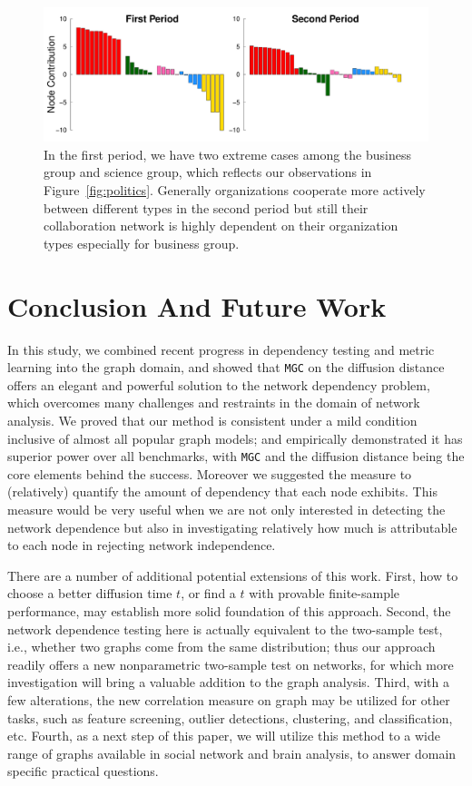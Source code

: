 \documentclass[11pt]{article}
\theoremstyle{definition}
\begin{document}
\begin{figure}[h]
	\centering
	\includegraphics[width=\linewidth]{barplots_nolegend.pdf}	
	\caption{In the first period, we have two extreme cases among the business group and science group, which reflects our observations in Figure~\ref{fig:politics}. Generally organizations cooperate more actively between different types in the second period but still their collaboration network is highly dependent on their organization types especially for business group.}
	\label{fig:barplots}
\end{figure}

\vspace*{-0.5cm}
\section{Conclusion And Future Work}
\label{sec:conc}
	\vspace*{-0.2cm}
In this study, we combined recent progress in dependency testing and metric learning into the graph domain, and showed that \texttt{MGC} on the diffusion distance offers an elegant and powerful solution to the network dependency problem, which overcomes many challenges and restraints in the domain of network analysis. We proved that our method is consistent under a mild condition inclusive of almost all popular graph models; and empirically demonstrated it has superior power over all benchmarks, with \texttt{MGC} and the diffusion distance being the core elements behind the success. Moreover we suggested the measure to (relatively) quantify the amount of dependency that each node exhibits. This measure would be very useful when we are not only interested in detecting the network dependence but also in investigating relatively how much is attributable to each node in rejecting network independence.  

There are a number of additional potential extensions of this work. First, how to choose a better diffusion time $t$, or find a $t$ with provable finite-sample performance, may establish more solid foundation of this approach. Second, the network dependence testing here is actually equivalent to the two-sample test, i.e., whether two graphs come from the same distribution; thus our approach readily offers a new nonparametric two-sample test on networks, for which more investigation will bring a valuable addition to the graph analysis. Third, with a few alterations, the new correlation measure on graph may be utilized for other tasks, such as feature screening, outlier detections, clustering, and classification, etc. Fourth, as a next step of this paper, we will utilize this method to a wide range of graphs available in social network and brain analysis, to answer domain specific practical questions.
\end{document}
